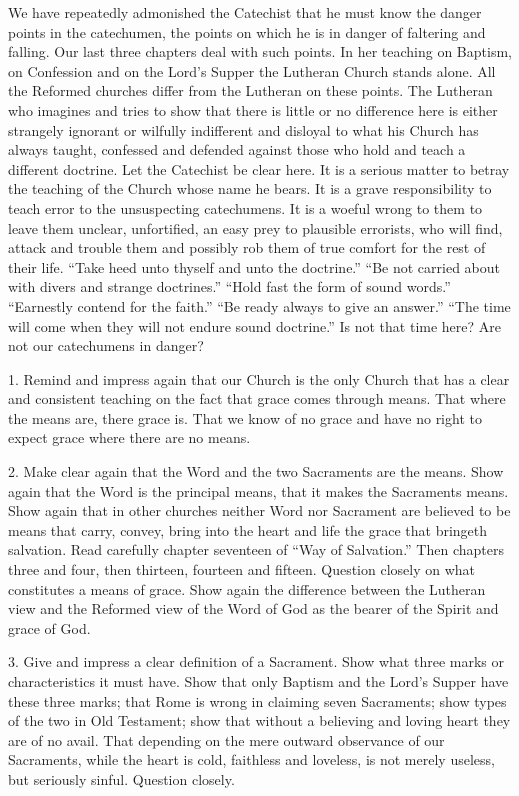 We have repeatedly admonished the Catechist that he must know the danger points in the catechumen, the points on which he is in danger of faltering and falling. Our last three chapters deal with such points. In her teaching on Baptism, on Confession and on the Lord’s Supper the Lutheran Church stands alone. All the Reformed churches differ from the Lutheran on these points. The Lutheran who imagines and tries to show that there is little or no difference here is either strangely ignorant or wilfully indifferent and disloyal to what his Church has always taught, confessed and defended against those who hold and teach a different doctrine. Let the Catechist be clear here. It is a serious matter to betray the teaching of the Church whose name he bears.  It is a grave responsibility to teach error to the unsuspecting catechumens. It is a woeful wrong to them to leave them unclear, unfortified, an easy prey to plausible errorists, who will find, attack and trouble them and possibly rob them of true comfort for the rest of their life. “Take heed unto thyself and unto the doctrine.” “Be not carried about with divers and strange doctrines.”
“Hold fast the form of sound words.” “Earnestly contend for the faith.” “Be ready always to give an answer.” “The time will come when they will not endure sound doctrine.” Is not that time here? Are not our catechumens in danger?

1. Remind and impress again that our Church is the only Church that has a clear and consistent teaching on the fact that grace comes through means. That where the means are, there grace is. That we know of no grace and have no right to expect grace where there are no means. 

2. Make clear again that the Word and the two Sacraments are the means. Show again that the Word is the principal means, that it makes the Sacraments means. Show again that in other churches neither Word nor Sacrament are believed to be means that carry, convey, bring into the heart and life the grace that bringeth salvation. Read carefully chapter seventeen of “Way of Salvation.” Then chapters three and four, then thirteen, fourteen and fifteen. Question closely on what constitutes a means of grace. Show again the difference between the Lutheran view and the Reformed view of the Word of God as the bearer of the Spirit and grace of God. 

3. Give and impress a clear definition of a Sacrament. Show what three marks or characteristics it
must have. Show that only Baptism and the Lord’s Supper have these three marks; that Rome is wrong in claiming seven Sacraments; show types of the two in Old Testament; show that without a believing and loving heart they are of no avail. That depending on the mere outward observance of our Sacraments, while the heart is cold, faithless and loveless, is not merely useless, but seriously sinful. Question closely. 


